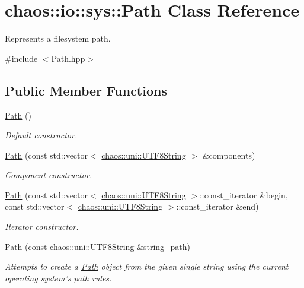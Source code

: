 \hypertarget{classchaos_1_1io_1_1sys_1_1_path}{\section{chaos\-:\-:io\-:\-:sys\-:\-:Path Class Reference}
\label{classchaos_1_1io_1_1sys_1_1_path}
}


Represents a filesystem path.  




{\ttfamily \#include $<$Path.\-hpp$>$}

\subsection*{Public Member Functions}
\begin{DoxyCompactItemize}
\item 
\hyperlink{classchaos_1_1io_1_1sys_1_1_path_a4212b2acfcc365769080ea5e915568ee}{Path} ()
\begin{DoxyCompactList}\small\item\em Default constructor. \end{DoxyCompactList}\item 
\hyperlink{classchaos_1_1io_1_1sys_1_1_path_a3647583a07600e50e51d70f1dadabcf5}{Path} (const std\-::vector$<$ \hyperlink{classchaos_1_1uni_1_1_u_t_f8_string}{chaos\-::uni\-::\-U\-T\-F8\-String} $>$ \&components)
\begin{DoxyCompactList}\small\item\em Component constructor. \end{DoxyCompactList}\item 
\hyperlink{classchaos_1_1io_1_1sys_1_1_path_af77a957df51fe41a9c5df2d52ca05585}{Path} (const std\-::vector$<$ \hyperlink{classchaos_1_1uni_1_1_u_t_f8_string}{chaos\-::uni\-::\-U\-T\-F8\-String} $>$\-::const\-\_\-iterator \&begin, const std\-::vector$<$ \hyperlink{classchaos_1_1uni_1_1_u_t_f8_string}{chaos\-::uni\-::\-U\-T\-F8\-String} $>$\-::const\-\_\-iterator \&end)
\begin{DoxyCompactList}\small\item\em Iterator constructor. \end{DoxyCompactList}\item 
\hyperlink{classchaos_1_1io_1_1sys_1_1_path_a1a18b44624caafeceb66edc7b99dbad6}{Path} (const \hyperlink{classchaos_1_1uni_1_1_u_t_f8_string}{chaos\-::uni\-::\-U\-T\-F8\-String} \&string\-\_\-path)
\begin{DoxyCompactList}\small\item\em Attempts to create a \hyperlink{classchaos_1_1io_1_1sys_1_1_path}{Path} object from the given single string using the current operating system's path rules. \end{DoxyCompactList}\item 

\end{DoxyCompactItemize}
